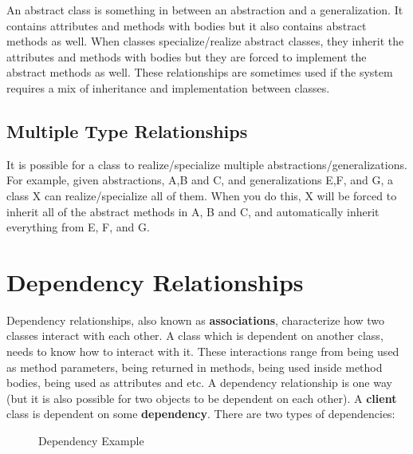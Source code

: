 An abstract class is something in between an abstraction and a
generalization. It contains attributes and methods with bodies but it
also contains abstract methods as well. When classes specialize/realize
abstract classes, they inherit the attributes and methods with bodies
but they are forced to implement the abstract methods as well. These
relationships are sometimes used if the system requires a mix of
inheritance and implementation between classes.

\subsection{Multiple Type
Relationships}\label{class-relationships.md__multiple-type-relationships}

It is possible for a class to realize/specialize multiple
abstractions/generalizations. For example, given abstractions, A,B and
C, and generalizations E,F, and G, a class X can realize/specialize all
of them. When you do this, X will be forced to inherit all of the
abstract methods in A, B and C, and automatically inherit everything
from E, F, and G.

\section{Dependency
Relationships}\label{class-relationships.md__dependency-relationships}

Dependency relationships, also known as \textbf{associations},
characterize how two classes interact with each other. A class which is
dependent on another class, needs to know how to interact with it. These
interactions range from being used as method parameters, being returned
in methods, being used inside method bodies, being used as attributes
and etc. A dependency relationship is one way (but it is also possible
for two objects to be dependent on each other). A \textbf{client} class
is dependent on some \textbf{dependency}. There are two types of
dependencies:

\begin{figure}
\centering
{}
\caption{Dependency Example}
\end{figure}

